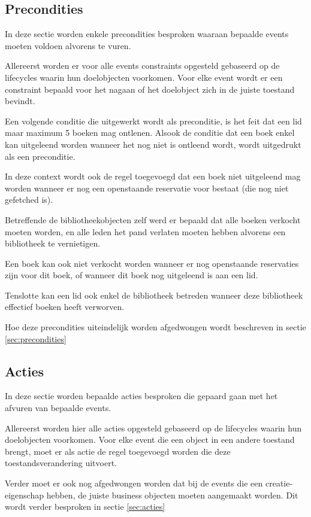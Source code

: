 \subsection{Precondities}
In deze sectie worden enkele precondities besproken waaraan bepaalde events moeten voldoen alvorens te vuren.

Allereerst worden er voor alle events constraints opgesteld gebaseerd op de lifecycles waarin hun doelobjecten voorkomen. Voor elke event wordt er een constraint bepaald voor het nagaan of het doelobject zich in de juiste toestand bevindt.

Een volgende conditie die uitgewerkt wordt als preconditie, is het feit dat een lid maar maximum 5 boeken mag ontlenen.
Alsook de conditie dat een boek enkel kan uitgeleend worden wanneer het nog niet is ontleend wordt, wordt uitgedrukt als een preconditie. 

In deze context wordt ook de regel toegevoegd dat een boek niet uitgeleend mag worden wanneer er nog een openstaande reservatie voor bestaat (die nog niet gefetched is).

Betreffende de bibliotheekobjecten zelf werd er bepaald dat alle boeken verkocht moeten worden, en alle leden het pand verlaten moeten hebben alvorens een bibliotheek te vernietigen.

Een boek kan ook niet verkocht worden wanneer er nog openstaande reservaties zijn voor dit boek, of wanneer dit boek nog uitgeleend is aan een lid.

Tenslotte kan een lid ook enkel de bibliotheek betreden wanneer deze bibliotheek effectief boeken heeft verworven. 

Hoe deze precondities uiteindelijk worden afgedwongen wordt beschreven in sectie \ref{sec:precondities} 
\subsection{Acties}
In deze sectie worden bepaalde acties besproken die gepaard gaan met het afvuren van bepaalde events.

Allereerst worden hier alle acties opgesteld gebaseerd op de lifecycles waarin hun doelobjecten voorkomen.
Voor elke event die een object in een andere toestand brengt, moet er als actie de regel toegevoegd worden die deze toestandsverandering uitvoert.

Verder moet er ook nog afgedwongen worden dat bij de events die een creatie-eigenschap hebben, de juiste business objecten moeten aangemaakt worden. Dit wordt verder besproken in sectie \ref{sec:acties}
